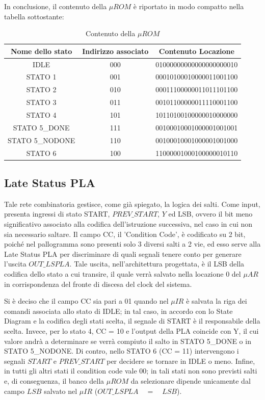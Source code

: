 \noindent In conclusione, il contenuto della $\mu ROM$ è riportato in modo compatto nella tabella sottostante:

\begin{table}[H]
    \centering
    \begin{tabular}{|c|c|c|}
        \hline
        \textbf{Nome dello stato} & \textbf{Indirizzo associato} & \textbf{Contenuto Locazione} \\
        \hline
        IDLE & 000 & 01000000000000000000010 \\
        \hline
        STATO 1 & 001 & 00010100010000011001100 \\
        \hline
        STATO 2 &  010 & 00011100000011011101100 \\
        \hline
        STATO 3 & 011 & 00101100000011110001100 \\
        \hline
        STATO 4 & 101 & 10110100100000010000000 \\
        \hline
        STATO 5\_DONE & 111 & 00100010001000001001001 \\
        \hline
        STATO 5\_NODONE & 110 & 00100010001000001001000 \\
        \hline
        STATO 6 & 100 & 11000001000100000010110 \\
        \hline
    \end{tabular}
    \caption{Contenuto della $\mu ROM$}
    \label{tab:stati_indirizzi}
\end{table}

\subsection{Late Status PLA}
\noindent Tale rete combinatoria gestisce, come già spiegato, la logica dei salti. Come input, presenta ingressi di stato START, $PREV\_START$, $Y$ ed LSB, ovvero il bit meno significativo associato alla codifica dell'istruzione successiva, nel caso in cui non sia necessario saltare. Il campo CC, il 'Condition Code', è codificato su 2 bit, poiché nel pallogramma sono presenti solo 3 diversi salti a 2 vie, ed esso serve alla Late Status PLA per discriminare di quali segnali tenere conto per generare l'uscita $OUT\_LSPLA$. Tale uscita, nell'architettura progettata, è il LSB della codifica dello stato a cui transire, il quale verrà salvato nella locazione 0 del $\mu AR$ in corrispondenza del fronte di discesa del clock del sistema.

\noindent Si è deciso che il campo CC sia pari a 01 quando nel $\mu IR$ è salvata la riga dei comandi associata allo stato di IDLE; in tal caso, in accordo con lo State Diagram e la codifica degli stati scelta, il segnale di START è il responsabile della scelta. Invece, per lo stato 4, CC  = 10 e l'output della PLA coincide con Y, il cui valore andrà a determinare se verrà compiuto il salto in STATO 5\_DONE o in STATO 5\_NODONE. Di contro, nello STATO 6 (CC = 11) intervengono i segnali $START$ e $PREV\_START$ per decidere se tornare in IDLE o meno. Infine, in tutti gli altri stati il condition code vale 00; in tali stati non sono previsti salti e, di conseguenza, il banco della $\mu ROM$ da selezionare dipende unicamente dal campo $LSB$ salvato nel $\mu IR$ ($OUT\_LSPLA \quad = \quad LSB$).

